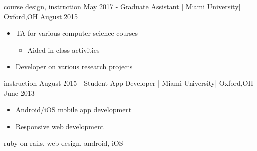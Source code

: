 \begin{experiences}
{                    }
                    {course design, instruction}
  \emptySeparator
  \experience
    {May 2017 -}     {Graduate Assistant | Miami University}{| Oxford,}{OH}
    {August 2015}    {
                        \begin{itemize}
                            \item {TA for various computer science courses}
                            \begin{itemize}
                                \item {Aided in-class activities}
                            \end{itemize}
                            \item {Developer on various research projects}
                      \end{itemize}
                    }
                    {instruction}
  \emptySeparator
  \experience
    {August 2015 -}     {Student App Developer | Miami University}{| Oxford,}{OH}
    {June 2013}    {
                        \begin{itemize}
                            \item {Android/iOS mobile app development}
                            \item {Responsive web development}
                        \end{itemize}
                    }
                    {ruby on rails, web design, android, iOS}
\end{experiences}
